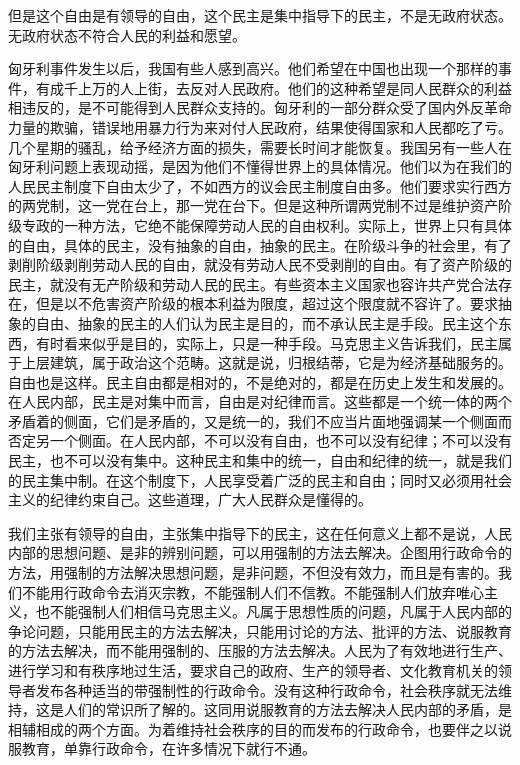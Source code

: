 但是这个自由是有领导的自由，这个民主是集中指导下的民主，不是无政府状态。无政府状态不符合人民的利益和愿望。

匈牙利事件发生以后，我国有些人感到高兴。他们希望在中国也出现一个那样的事件，有成千上万的人上街，去反对人民政府。他们的这种希望是同人民群众的利益相违反的，是不可能得到人民群众支持的。匈牙利的一部分群众受了国内外反革命力量的欺骗，错误地用暴力行为来对付人民政府，结果使得国家和人民都吃了亏。几个星期的骚乱，给予经济方面的损失，需要长时间才能恢复。我国另有一些人在匈牙利问题上表现动摇，是因为他们不懂得世界上的具体情况。他们以为在我们的人民民主制度下自由太少了，不如西方的议会民主制度自由多。他们要求实行西方的两党制，这一党在台上，那一党在台下。但是这种所谓两党制不过是维护资产阶级专政的一种方法，它绝不能保障劳动人民的自由权利。实际上，世界上只有具体的自由，具体的民主，没有抽象的自由，抽象的民主。在阶级斗争的社会里，有了剥削阶级剥削劳动人民的自由，就没有劳动人民不受剥削的自由。有了资产阶级的民主，就没有无产阶级和劳动人民的民主。有些资本主义国家也容许共产党合法存在，但是以不危害资产阶级的根本利益为限度，超过这个限度就不容许了。要求抽象的自由、抽象的民主的人们认为民主是目的，而不承认民主是手段。民主这个东西，有时看来似乎是目的，实际上，只是一种手段。马克思主义告诉我们，民主属于上层建筑，属于政治这个范畴。这就是说，归根结蒂，它是为经济基础服务的。自由也是这样。民主自由都是相对的，不是绝对的，都是在历史上发生和发展的。在人民内部，民主是对集中而言，自由是对纪律而言。这些都是一个统一体的两个矛盾着的侧面，它们是矛盾的，又是统一的，我们不应当片面地强调某一个侧面而否定另一个侧面。在人民内部，不可以没有自由，也不可以没有纪律；不可以没有民主，也不可以没有集中。这种民主和集中的统一，自由和纪律的统一，就是我们的民主集中制。在这个制度下，人民享受着广泛的民主和自由；同时又必须用社会主义的纪律约束自己。这些道理，广大人民群众是懂得的。

我们主张有领导的自由，主张集中指导下的民主，这在任何意义上都不是说，人民内部的思想问题、是非的辨别问题，可以用强制的方法去解决。企图用行政命令的方法，用强制的方法解决思想问题，是非问题，不但没有效力，而且是有害的。我们不能用行政命令去消灭宗教，不能强制人们不信教。不能强制人们放弃唯心主义，也不能强制人们相信马克思主义。凡属于思想性质的问题，凡属于人民内部的争论问题，只能用民主的方法去解决，只能用讨论的方法、批评的方法、说服教育的方法去解决，而不能用强制的、压服的方法去解决。人民为了有效地进行生产、进行学习和有秩序地过生活，要求自己的政府、生产的领导者、文化教育机关的领导者发布各种适当的带强制性的行政命令。没有这种行政命令，社会秩序就无法维持，这是人们的常识所了解的。这同用说服教育的方法去解决人民内部的矛盾，是相辅相成的两个方面。为着维持社会秩序的目的而发布的行政命令，也要伴之以说服教育，单靠行政命令，在许多情况下就行不通。

